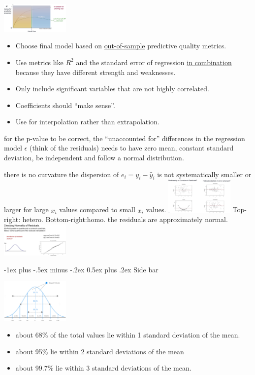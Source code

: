 \documentclass[10pt,landscape]{article}
\makeatletter
\renewcommand{\section}{\@startsection{section}{1}{0mm}%
                                {-1ex plus -.5ex minus -.2ex}%
                                {0.5ex plus .2ex}%
                                {\normalfont\large\bfseries}}
\newcommand{\Red}[1]{\noindent{\textbf{\textcolor{BrickRed}{#1 -}}}}
\newcommand{\Green}[1]{\noindent{\textbf{\textcolor{PineGreen}{#1 -}}}}
\makeatother
\begin{document}
\begin{multicols}{4}
\includegraphics[width=0.25\textwidth]{overfitting.jpg}

\Red{Key takeaways}

\begin{itemize}
    \item Choose final model based on \underline{out-of-sample} predictive quality metrics.
    \item Use metrics like $R^2$ and the standard error of regression \underline{in combination} because they have different strength and weaknesses.
    \item Only include significant variables that are not highly correlated.
    \item Coefficients should ``make sense''.
    \item Use for interpolation rather than extrapolation.
\end{itemize}

\Red{Technical caution} for the p-value to be correct, the ``unaccounted for'' differences in the regression model
$\epsilon$ (think of the residuals) needs to have zero mean, constant standard deviation, be independent and follow a normal distribution.

\Green{Linearity} there is no curvature
\Green{Homoskedasticity} the dispersion of $e_i = y_i - \hat{y}_i$ is not systematically smaller or larger for large
$x_i$ values compared to small $x_i$ values.
\includegraphics[width=0.25\textwidth]{residuals1.jpg}
Top-right: hetero. Bottom-right:homo.
\Green{Normality} the residuals are approximately normal.
\includegraphics[width=0.25\textwidth]{residuals2.jpg}


\section{Side bar}

\includegraphics[width=0.25\textwidth]{normal_distribution_property.jpg}

\begin{itemize}
    \item about 68\% of the total values lie within 1 standard deviation of the mean. 
    \item about 95\% lie within 2 standard deviations of the mean
    \item about 99.7\% lie within 3 standard deviations of the mean.
\end{itemize}

\end{multicols}
\end{document}
